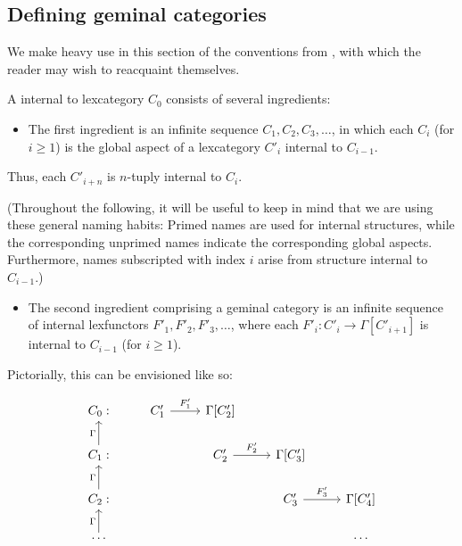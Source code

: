 \subsection{Defining geminal categories}
We make heavy use in this section of the conventions from , with which the reader may wish to reacquaint themselves. 

\begin{definition}\label{VerboseGeminalCatDefn}
A  internal to lexcategory $C_0$ consists of several ingredients:

\begin{itemize}
    \item 
    The first ingredient is an infinite sequence $C_1, C_2, C_3, \ldots$, in which each $C_i$ (for $i \geq 1$) is the global aspect of a lexcategory $C'_i$ internal to $C_{i - 1}$.
\end{itemize}

Thus, each $C'_{i + n}$ is $n$-tuply internal to $C_i$.

(Throughout the following, it will be useful to keep in mind that we are using these general naming habits: Primed names are used for internal structures, while the corresponding unprimed names indicate the corresponding global aspects. Furthermore, names subscripted with index $i$ arise from structure internal to $C_{i - 1}$.)

\begin{itemize}
    \item
    The second ingredient comprising a geminal category is an infinite sequence of internal lexfunctors $F'_1, F'_2, F'_3, \ldots$, where each $F'_i : C'_i \to \Gamma[C'_{i + 1}]$ is internal to $C_{i - 1}$ (for $i \geq 1$).
\end{itemize}

Pictorially, this can be envisioned like so: 

\[\begin{tikzcd}
	{C_0:} & {C'_1} & {\Gamma[C'_2]} \\
	{C_1:} && {C'_2} & {\Gamma[C'_3]} \\
	{C_2:} &&& {C'_3} & {\Gamma[C'_4]} \\
	\ldots &&&& \ldots
	\arrow["{F'_1}", from=1-2, to=1-3]
	\arrow["{F'_2}", from=2-3, to=2-4]
	\arrow["{F'_3}", from=3-4, to=3-5]
	\arrow["\Gamma", from=2-1, to=1-1]
	\arrow["\Gamma", from=3-1, to=2-1]
	\arrow["\Gamma", from=4-1, to=3-1]
\end{tikzcd}\]


\end{definition}
